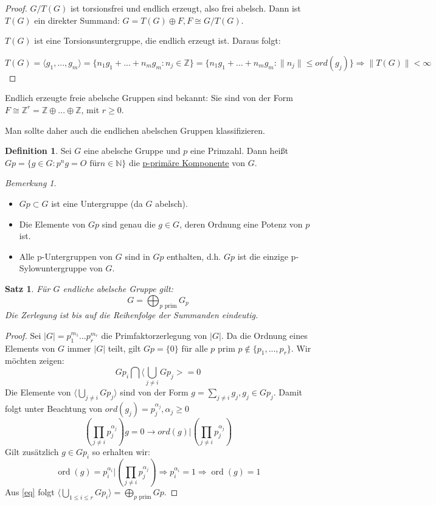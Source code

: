 \documentclass[12pt]{scrartcl} %
\DeclareMathOperator{\ord}{ord}
\newtheorem{thm}{Satz}
\theoremstyle{definition}
\newtheorem*{defn}{Definition}
\theoremstyle{remark}
\newtheorem*{nb}{Bemerkung}
\begin{document}
\begin{proof}
$G/T(G)$ ist torsionsfrei und endlich erzeugt, also frei abelsch. Dann ist $T(G)$ ein direkter Summand: $G = T(G) \oplus F,F\cong G/T(G)$.

$T(G)$ ist eine Torsionsuntergruppe, die endlich erzeugt ist. Daraus folgt: 

$T(G)=\langle g_{1},...,g_{m}\rangle=\{ n_{1}g_{1}+...+n_{m}g_{m}:n_{j}\in \mathbb{Z}\}=\{ n_{1}g_{1}+...+n_{m}g_{m}:\|n_{j}\| \leq ord(g_{j})\} \Rightarrow \|T(G)\| < \infty$
\end{proof}

Endlich erzeugte freie abelsche Gruppen sind bekannt: Sie sind von der Form $F\cong \mathbb{Z}^{r}=\mathbb{Z} \oplus ...\oplus \mathbb{Z}$, mit $r\geq 0$.

Man sollte daher auch die endlichen abelschen Gruppen klassifizieren.

\begin{defn}
Sei $G$ eine abelsche Gruppe und $p$ eine Primzahl. 
Dann heißt $Gp=\{ g\in G:p^{n}g=O\text{ für} n\in  \mathbb{N} \} $ 
die \underline{p-primäre Komponente} von $G$.
\end{defn}

\begin{nb}
\begin{itemize}
\item $Gp\subset G$ ist eine Untergruppe (da $G$ abelsch).
\item Die Elemente von $Gp$ sind genau die $g\in G$, deren Ordnung eine Potenz von $p$ ist.
\item Alle p-Untergruppen von $G$ sind in $Gp$ enthalten, d.h. $Gp$ ist die einzige p-Sylowuntergruppe von $G$.
\end{itemize}
\end{nb}

\begin{thm}
Für $G$ endliche abelsche Gruppe gilt:
\[ G=\bigoplus_{p \text{ prim}} G_{p} \]
Die Zerlegung ist bis auf die Reihenfolge der Summanden eindeutig.
\end{thm}

\begin{proof}
Sei $| G| =p_{1}^{m_{1}}...p_{r}^{m_{r}}$ die Primfaktorzerlegung von $| G|$. 
Da die Ordnung eines Elements von $G$ immer $| G|$ teilt, gilt $Gp=\{ 0\}$ für alle $p$ prim $p\notin \{ p_{1},...,p_{r}\}$. Wir möchten zeigen:
\begin{equation} \label{eq}
Gp_{i}\bigcap \langle\bigcup_{j\neq i} Gp_{j}> ={0}
\end{equation}
Die Elemente von $\langle\bigcup_{j\neq i} Gp_{j}\rangle$ sind von der Form $g=\sum_{j\neq i} g_{j}, g_{j} \in Gp_{j}$. Damit folgt unter Beachtung von $ord(g_{j})=p_{j}^{\alpha_{j}}, \alpha_{j}\geq 0$ 
\[(\prod_{j\neq i} p_{j}^{\alpha_{j}})g=0 \rightarrow ord(g)| (\prod_{j\neq i} p_{j}^{\alpha_{j}})\]
Gilt zusätzlich $g \in Gp_{i}$ so erhalten wir:
\[ \ord(g)=p_{i}^{\alpha_{i}}| (\prod_{j\neq i} p_{j}^{\alpha_{j}})\Rightarrow p_{i}^{\alpha_{i}}=1 \Rightarrow \ord(g)=1\]
Aus \eqref{eq} folgt $\langle\bigcup_{1\leq i\leq r} Gp_{i}\rangle = \bigoplus_{p\text{ prim}} Gp$.
\end{proof}
\end{document}
